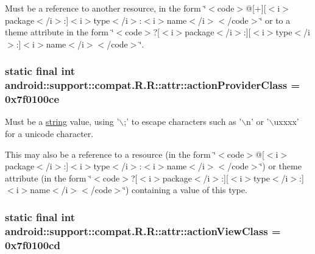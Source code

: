 Must be a reference to another resource, in the form \char`\"{}$<$code$>$@\mbox{[}+\mbox{]}\mbox{[}$<$i$>$package$<$/i$>$:\mbox{]}$<$i$>$type$<$/i$>$:$<$i$>$name$<$/i$>$$<$/code$>$\char`\"{} or to a theme attribute in the form \char`\"{}$<$code$>$?\mbox{[}$<$i$>$package$<$/i$>$:\mbox{]}\mbox{[}$<$i$>$type$<$/i$>$:\mbox{]}$<$i$>$name$<$/i$>$$<$/code$>$\char`\"{}. \hypertarget{classandroid_1_1support_1_1compat_1_1_r_1_1attr_3449f32daa5c083bd0a03b98857d0a79}{
\subsubsection[{actionProviderClass}]{\setlength{\rightskip}{0pt plus 5cm}static final int android::support::compat.R.R::attr::actionProviderClass = 0x7f0100ce}}
\label{classandroid_1_1support_1_1compat_1_1_r_1_1attr_3449f32daa5c083bd0a03b98857d0a79}


Must be a \hyperlink{classandroid_1_1support_1_1compat_1_1_r_1_1string}{string} value, using '$\backslash$;' to escape characters such as '$\backslash$n' or '$\backslash$uxxxx' for a unicode character. 

This may also be a reference to a resource (in the form \char`\"{}$<$code$>$@\mbox{[}$<$i$>$package$<$/i$>$:\mbox{]}$<$i$>$type$<$/i$>$:$<$i$>$name$<$/i$>$$<$/code$>$\char`\"{}) or theme attribute (in the form \char`\"{}$<$code$>$?\mbox{[}$<$i$>$package$<$/i$>$:\mbox{]}\mbox{[}$<$i$>$type$<$/i$>$:\mbox{]}$<$i$>$name$<$/i$>$$<$/code$>$\char`\"{}) containing a value of this type. \hypertarget{classandroid_1_1support_1_1compat_1_1_r_1_1attr_8d319a6a1b29a060479aec517a551192}{
\subsubsection[{actionViewClass}]{\setlength{\rightskip}{0pt plus 5cm}static final int android::support::compat.R.R::attr::actionViewClass = 0x7f0100cd}}
\label{classandroid_1_1support_1_1compat_1_1_r_1_1attr_8d319a6a1b29a060479aec517a551192}


